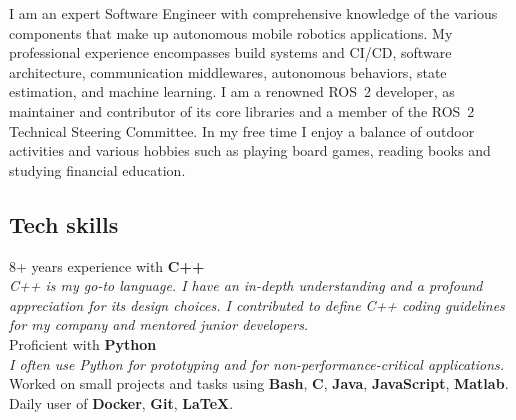 \documentclass[letterpaper]{soragna-onepage-twocols} %
\begin{document}
\begin{minipage}[t]{0.3\textwidth} %



I am an expert Software Engineer with comprehensive knowledge of the various components that make up autonomous mobile robotics applications.
My professional experience encompasses build systems and CI/CD, software architecture, communication middlewares, autonomous behaviors, state estimation, and machine learning.
I am a renowned ROS~2 developer, as maintainer and contributor of its core libraries and a member of the ROS~2 Technical Steering Committee.
In my free time I enjoy a balance of outdoor activities and various hobbies such as playing board games, reading books and studying financial education.

\sectionspace %




\vspace{-12pt} %
\sectionspace %



\subsection{Tech skills}

8+ years experience with \textbf{C++}\\
{\emph{C++ is my go-to language.
I have an in-depth understanding and a profound appreciation for its design choices.
I contributed to define C++ coding guidelines for my company and mentored junior developers. }}\\
Proficient with \textbf{Python}\\
{\emph{I often use Python for prototyping and for non-performance-critical applications.}}\\
Worked on small projects and tasks using \textbf{Bash}, \textbf{C}, \textbf{Java}, \textbf{JavaScript},  \textbf{Matlab}.\\
Daily user of \textbf{Docker}, \textbf{Git}, \textbf{LaTeX}.\\


\end{minipage}
\end{document}
